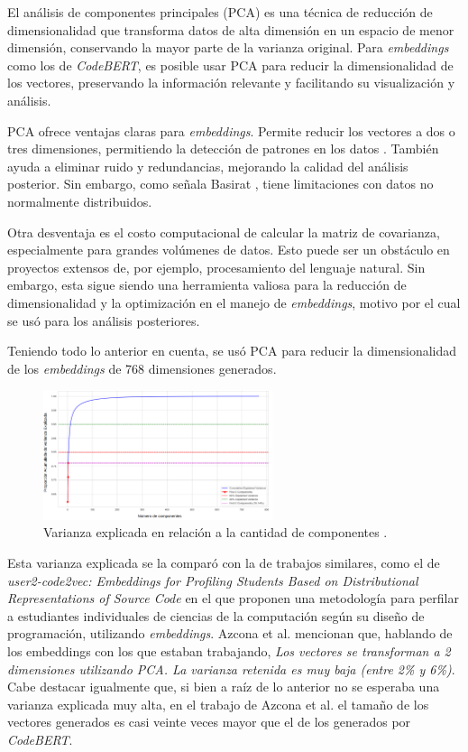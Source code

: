 \documentclass[11pt,a4paper,twoside,openany]{tesis}
\begin{document}
El análisis de componentes principales (PCA) es una técnica de reducción de dimensionalidad que transforma datos de alta dimensión en un espacio de menor dimensión, conservando la mayor parte de la varianza original. Para \emph{embeddings} como los de \emph{CodeBERT}, es posible usar PCA para reducir la dimensionalidad de los vectores, preservando la información relevante y facilitando su visualización y análisis\cite{pca-musil}.

PCA ofrece ventajas claras para \emph{embeddings}. Permite reducir los vectores a dos o tres dimensiones, permitiendo la detección de patrones en los datos \cite{pca-musil}. También ayuda a eliminar ruido y redundancias, mejorando la calidad del análisis posterior. Sin embargo, como señala Basirat \cite{pca-basirat}, tiene limitaciones con datos no normalmente distribuidos.

Otra desventaja es el costo computacional de calcular la matriz de covarianza, especialmente para grandes volúmenes de datos. Esto puede ser un obstáculo en proyectos extensos de, por ejemplo, procesamiento del lenguaje natural\cite{pca-basirat}. Sin embargo, esta sigue siendo una herramienta valiosa para la reducción de dimensionalidad y la optimización en el manejo de \emph{embeddings}, motivo por el cual se usó para los análisis posteriores.

Teniendo todo lo anterior en cuenta, se usó PCA para reducir la dimensionalidad de los \emph{embeddings} de 768 dimensiones generados. 

\begin{figure}[H]
    \centering
    \includegraphics[width=0.6\textwidth]{imagenes/varianza-explicada.png}
    \caption{Varianza explicada en relación a la cantidad de componentes .}
\end{figure}

Esta varianza explicada se la comparó con la de trabajos similares, como el de \emph{user2-code2vec: Embeddings for Profiling Students Based on Distributional Representations of Source Code} \cite{user2code} en el que proponen una metodología para perfilar a estudiantes individuales de ciencias de la computación según su diseño de programación, utilizando \emph{embeddings}. Azcona et al. mencionan que, hablando de los embeddings con los que estaban trabajando, \emph{Los vectores se transforman a 2 dimensiones utilizando PCA. La varianza retenida es muy baja (entre 2\% y 6\%)}. Cabe destacar igualmente que, si bien a raíz de lo anterior no se esperaba una varianza explicada muy alta, en el trabajo de Azcona et al. el tamaño de los vectores generados es casi veinte veces mayor que el de los generados por \emph{CodeBERT}.
\end{document}
